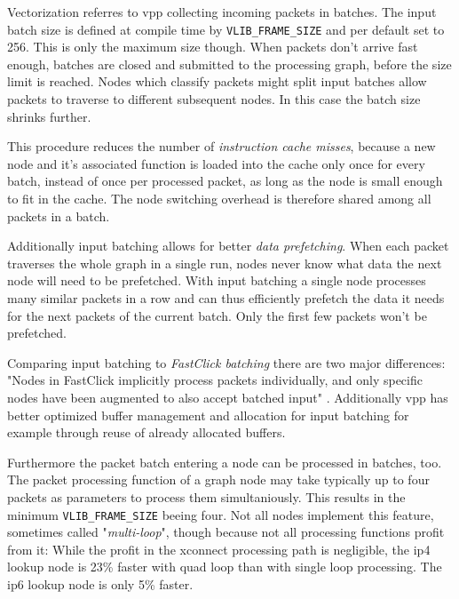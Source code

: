 Vectorization referres to \Ac{vpp} collecting incoming packets in
batches. The input batch size is defined at compile time by
\lstinline|VLIB_FRAME_SIZE| and per default set to 256. This is only
the maximum size though. When packets don't arrive fast enough,
batches are closed and submitted to the processing graph, before the
size limit is reached. Nodes which classify packets might split input
batches allow packets to traverse to different subsequent nodes. In
this case the batch size shrinks further.

This procedure reduces the number of \textit{instruction cache misses}, because
a new node and it's associated function is loaded into the cache only
once for every batch, instead of once per processed packet, as long as
the node is small enough to fit in the cache. The node switching
overhead is therefore shared among all packets in a batch.

Additionally input batching allows for better \textit{data prefetching}. When
each packet traverses the whole graph in a single run, nodes never
know what data the next node will need to be prefetched. With input
batching a single node processes many similar packets in a row and can
thus efficiently prefetch the data it needs for the next packets of
the current batch. Only the first few packets won't be prefetched.

Comparing input batching to \textit{FastClick batching} there are two major
differences: "Nodes in FastClick implicitly process packets
individually, and only specific nodes have been augmented to also
accept batched input" \cite{linguaglossa2017high}. Additionally
\Ac{vpp} has better optimized buffer management and allocation for
input batching for example through reuse of already allocated buffers.
\cite{linguaglossa2017high}

Furthermore the packet batch entering a node can be processed in
batches, too. The packet processing function of a graph node may take
typically up to four packets as parameters to process them
simultaniously. This results in the minimum
\lstinline|VLIB_FRAME_SIZE| beeing four. Not all nodes implement this
feature, sometimes called "\textit{multi-loop}", though because not
all processing functions profit from it: While the profit in the
xconnect processing path is negligible, the \Ac{ip4} lookup node is
23\% faster with quad loop than with single loop processing. The
\Ac{ip6} lookup node is only 5\% faster. \cite{linguaglossa2017high}



